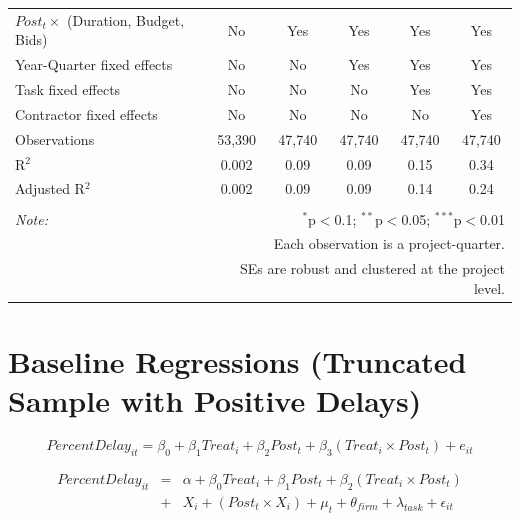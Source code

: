 \documentclass[
]{article}
\begin{document}
\begin{table}[H]
\begin{tabular}{@{\extracolsep{-2pt}}lccccc}
$Post_t \times$  (Duration, Budget, Bids) & No & Yes & Yes & Yes & Yes \\ 
Year-Quarter fixed effects & No & No & Yes & Yes & Yes \\ 
Task fixed effects & No & No & No & Yes & Yes \\ 
Contractor fixed effects & No & No & No & No & Yes \\ 
Observations & 53,390 & 47,740 & 47,740 & 47,740 & 47,740 \\ 
R$^{2}$ & 0.002 & 0.09 & 0.09 & 0.15 & 0.34 \\ 
Adjusted R$^{2}$ & 0.002 & 0.09 & 0.09 & 0.14 & 0.24 \\ 
\hline 
\hline \\[-1.8ex] 
\textit{Note:}  & \multicolumn{5}{r}{$^{*}$p$<$0.1; $^{**}$p$<$0.05; $^{***}$p$<$0.01} \\ 
 & \multicolumn{5}{r}{Each observation is a project-quarter.} \\ 
 & \multicolumn{5}{r}{SEs are robust and clustered at the project level.} \\ 
\end{tabular} 
\end{table}

\hypertarget{baseline-regressions-truncated-sample-with-positive-delays}{%
\section{Baseline Regressions (Truncated Sample with Positive
Delays)}\label{baseline-regressions-truncated-sample-with-positive-delays}}

\[ PercentDelay_{it} = \beta_0 + \beta_1 Treat_i + \beta_2 Post_t + \beta_3 (Treat_i \times Post_t) + e_{it}\]

\[ \begin{aligned} PercentDelay_{it} &=& \alpha+\beta_0 Treat_i + \beta_1 Post_t + \beta_2 (Treat_i \times Post_t)\\
&+&  X_i + (Post_t \times X_i) + \mu_t + \theta_{firm} + \lambda_{task}+ \epsilon_{it}
\end{aligned}\]
\end{document}
